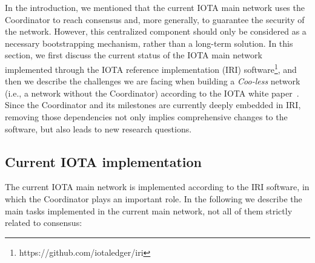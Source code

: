 \documentclass[../main.tex]{subfiles}
\begin{document}
In the introduction, we mentioned that the current IOTA main network uses the Coordinator to reach consensus and, more generally, to guarantee the security of the network. However, this centralized component should only be considered as a necessary bootstrapping mechanism, rather than a long-term solution. In this section, we first discuss the current status of the IOTA main network implemented through the IOTA reference implementation (IRI) software\footnote{{https://github.com/iotaledger/iri}}, and then we describe the challenges we are facing when building a \textit{Coo-less} network (i.e., a network without the Coordinator) according to the IOTA white paper~\cite{popov2018}. Since the Coordinator and its milestones are currently deeply embedded in IRI, removing those dependencies not only implies comprehensive changes to the software, but also leads to new research questions.

\subsection{Current IOTA implementation}\label{sec:coo-dep}

The current IOTA main network is implemented according to the IRI software, in which the Coordinator plays an important role. In the following we describe the main tasks implemented in the current main network, not all of them strictly related to consensus:
\end{document}
